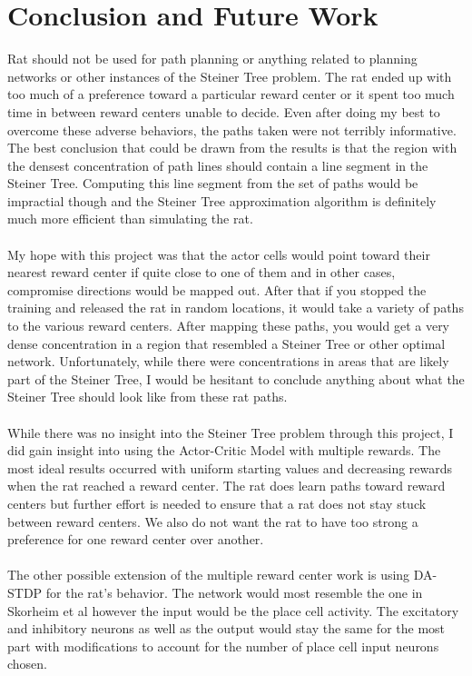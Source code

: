 \documentclass[conference]{IEEEtran}
\begin{document}
\section{Conclusion and Future Work}

Rat should not be used for path planning or anything related to planning networks or other instances of the Steiner Tree problem. The rat ended up with too much of a preference toward a particular reward center or it spent too much time in between reward centers unable to decide. Even after doing my best to overcome these adverse behaviors, the paths taken were not terribly informative. The best conclusion that could be drawn from the results is that the region with the densest concentration of path lines should contain a line segment in the Steiner Tree. Computing this line segment from the set of paths would be impractial though and the Steiner Tree approximation algorithm \cite{steiner1,steiner2} is definitely much more efficient than simulating the rat. \\
\\
My hope with this project was that the actor cells would point toward their nearest reward center if quite close to one of them and in other cases, compromise directions would be mapped out. After that if you stopped the training and released the rat in random locations, it would take a variety of paths to the various reward centers. After mapping these paths, you would get a very dense concentration in a region that resembled a Steiner Tree or other optimal network. Unfortunately, while there were concentrations in areas that are likely part of the Steiner Tree, I would be hesitant to conclude anything about what the Steiner Tree should look like from these rat paths. \\
\\
While there was no insight into the Steiner Tree problem through this project, I did gain insight into using the Actor-Critic Model with multiple rewards. The most ideal results occurred with uniform starting values and decreasing rewards when the rat reached a reward center. The rat does learn paths toward reward centers but further effort is needed to ensure that a rat does not stay stuck between reward centers. We also do not want the rat to have too strong a preference for one reward center over another.\\
\\
The other possible extension of the multiple reward center work is using DA-STDP for the rat's behavior. The network would most resemble the one in Skorheim et al \cite{plosone} however the input would be the place cell activity. The excitatory and inhibitory neurons as well as the output would stay the same for the most part with modifications to account for the number of place cell input neurons chosen.
\end{document}
